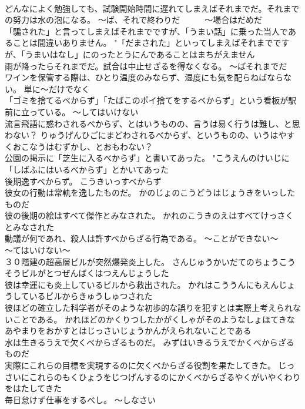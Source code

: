 \documentclass[8pt]{extreport}
\begin{document}
\begin{CJK}{UTF8}{min}
\\	どんなによく勉強しても、試験開始時間に遅れてしまえばそれまでだ。それまでの努力は水の泡になる。	～ば、それで終わりだ　　　～場合はだめだ
\\	「騙された」と言ってしまえばそれまでですが、「うまい話」に乗った当人であることは間違いありません。	"「だまされた」といってしまえばそれまでですが、「うまいはなし」にのったとうにんであることはまちがえません 
\\	雨が降ったらそれまでだ。試合は中止せざるを得なくなる。	～ばそれまでだ
\\	ワインを保管する際は、ひとり温度のみならず、湿度にも気を配らねばならない。	単に～だけでなく
\\	「ゴミを捨てるべからず」「たばこのポイ捨てをするべからず」という看板が駅前に立っている。	～してはいけない
\\	流言飛語に惑わされるべからず、とはいうものの、言うは易く行うは難し、と思わない？	りゅうげんひごにまどわされるべからず、というものの、いうはやすくおこなうはむずかし、とおもわない？ 
\\	公園の掲示に「芝生に入るべからず」と書いてあった。	"こうえんのけいじに「しばふにはいるべからず」とかいてあった 
\\	後期逸すべからず。	こうきいっすべからず 
\\	彼女の行動は常軌を逸したものだ。	かのじょのこうどうはじょうきをいっしたものだ 
\\	彼の後期の絵はすべて傑作とみなされた。	かれのこうきのえはすべてけっさくとみなされた 
\\	動議が何であれ、殺人は許すべからざる行為である。	～ことができない～　　　～てはいけない～
\\	３０階建の超高層ビルが突然爆発炎上した。	さんじゅうかいだてのちょうこうそうビルがとつぜんばくはつえんじょうした 
\\	彼は幸運にも炎上しているビルから救出された。	かれはこううんにもえんじょうしているビルからきゅうしゅつされた 
\\	彼ほどの確立した科学者がそのような初歩的な誤りを犯すとは実際上考えられないことである。	かれほどのかくりつしたかがくしゃがそのようなしょほてきなあやまりをおかすとはじっさいじょうかんがえられないことである 
\\	水は生きるうえで欠くべからざるものだ。	みずはいきるうえでかくべからざるものだ 
\\	実際にこれらの目標を実現するのに欠くべからざる役割を果たしてきた。	じっさいにこれらのもくひょうをじつげんするのにかくべからざるやくがいやくわりをはたしてきた 
\\	毎日怠けず仕事をするべし。	～しなさい

\end{CJK}
\end{document}
